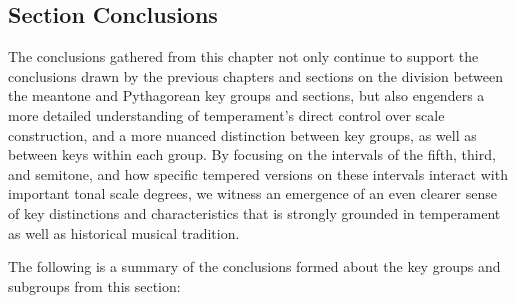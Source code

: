     \subsection{Section Conclusions}\label{section-conclusions}

The conclusions gathered from this chapter not only continue to support
the conclusions drawn by the previous chapters and sections on the
division between the meantone and Pythagorean key groups and sections,
but also engenders a more detailed understanding of temperament's direct
control over scale construction, and a more nuanced distinction between
key groups, as well as between keys within each group. By focusing on
the intervals of the fifth, third, and semitone, and how specific
tempered versions on these intervals interact with important tonal scale
degrees, we witness an emergence of an even clearer sense of key
distinctions and characteristics that is strongly grounded in
temperament as well as historical musical tradition.

The following is a summary of the conclusions formed about the key
groups and subgroups from this section:

